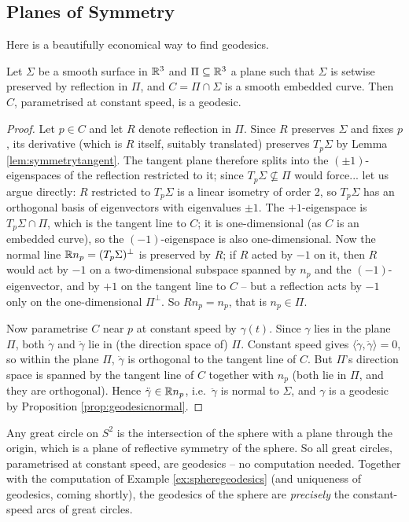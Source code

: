 \documentclass[a4paper]{scrartcl}
\begin{document}
\subsection{Planes of Symmetry}

Here is a beautifully economical way to find geodesics.

\begin{proposition}\label{prop:planesymmetry}
    Let $\Sigma$ be a smooth surface in $\mathbb{R}^3$ and $\Pi \subseteq \mathbb{R}^3$ a plane such that $\Sigma$ is setwise preserved by reflection in $\Pi$, and $C = \Pi \cap \Sigma$ is a smooth embedded curve. Then $C$, parametrised at constant speed, is a geodesic.
\end{proposition}
\begin{proof}
    Let $p \in C$ and let $R$ denote reflection in $\Pi$. Since $R$ preserves $\Sigma$ and fixes $p$, its derivative (which is $R$ itself, suitably translated) preserves $T_p\Sigma$ by Lemma \ref{lem:symmetrytangent}. The tangent plane therefore splits into the $(\pm 1)$-eigenspaces of the reflection restricted to it; since $T_p\Sigma \not\subseteq \Pi$ would force... let us argue directly: $R$ restricted to $T_p\Sigma$ is a linear isometry of order 2, so $T_p\Sigma$ has an orthogonal basis of eigenvectors with eigenvalues $\pm 1$. The $+1$-eigenspace is $T_p\Sigma \cap \Pi$, which is the tangent line to $C$; it is one-dimensional (as $C$ is an embedded curve), so the $(-1)$-eigenspace is also one-dimensional. Now the normal line $\mathbb{R} n_p = (T_p\Sigma)^\perp$ is preserved by $R$; if $R$ acted by $-1$ on it, then $R$ would act by $-1$ on a two-dimensional subspace spanned by $n_p$ and the $(-1)$-eigenvector, and by $+1$ on the tangent line to $C$ -- but a reflection acts by $-1$ only on the one-dimensional $\Pi^\perp$. So $R n_p = n_p$, that is $n_p \in \Pi$.

    Now parametrise $C$ near $p$ at constant speed by $\gamma(t)$. Since $\gamma$ lies in the plane $\Pi$, both $\dot\gamma$ and $\ddot\gamma$ lie in (the direction space of) $\Pi$. Constant speed gives $\langle \dot\gamma, \ddot\gamma\rangle = 0$, so within the plane $\Pi$, $\ddot\gamma$ is orthogonal to the tangent line of $C$. But $\Pi$'s direction space is spanned by the tangent line of $C$ together with $n_p$ (both lie in $\Pi$, and they are orthogonal). Hence $\ddot\gamma \in \mathbb{R} n_p$, i.e.\ $\ddot\gamma$ is normal to $\Sigma$, and $\gamma$ is a geodesic by Proposition \ref{prop:geodesicnormal}.
\end{proof}

\begin{example}
    Any great circle on $S^2$ is the intersection of the sphere with a plane through the origin, which is a plane of reflective symmetry of the sphere. So all great circles, parametrised at constant speed, are geodesics -- no computation needed. Together with the computation of Example \ref{ex:spheregeodesics} (and uniqueness of geodesics, coming shortly), the geodesics of the sphere are \emph{precisely} the constant-speed arcs of great circles.
\end{example}
\end{document}
